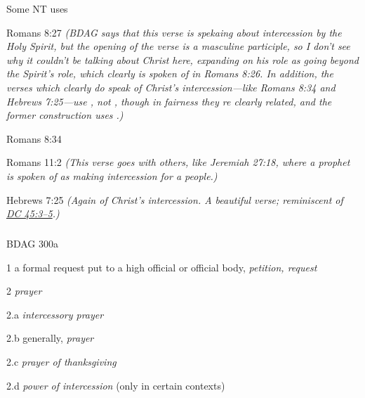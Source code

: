 				\begin{compactdesc}
					\item[Some NT uses] \textbf{}
						\begin{compactdesc}
							\item[Romans 8:27]  \textit{(BDAG says that this verse is spekaing about intercession by the Holy Spirit, but the opening of the verse is a masculine participle, so I don't see why it couldn't be talking about Christ here, expanding on his role as going beyond the Spirit's role, which clearly is spoken of in Romans 8:26. In addition, the verses which clearly do speak of Christ's intercession---like Romans 8:34 and Hebrews 7:25---use , not , though in fairness they re clearly related, and the former construction uses .)}
							\item[Romans 8:34] 
							\item[Romans 11:2]  \textit{(This verse goes with others, like Jeremiah 27:18, where a prophet is spoken of as making intercession for a people.)}
							\item[Hebrews 7:25]  \textit{(Again of Christ's intercession. A beautiful verse; reminiscent of \hyperref[DC45-3]{DC 45:3--5}.)}
						\end{compactdesc}
				\end{compactdesc}
				
			\subparagraph{\texorpdfstring{\gr{ἔντευξις}}{}}
				\label{ENTEUXIS}
			
				\begin{compactdesc}
					\item[BDAG 300a] \textbf{}
						\begin{compactitem}
							\item[1] a formal request put to a high official or official body, \textit{petition, request}
							\item[2] \textit{prayer}
							\item[2.a] \textit{intercessory prayer}
							\item[2.b] generally, \textit{prayer}
							\item[2.c] \textit{prayer of thanksgiving}
							\item[2.d] \textit{power of intercession} (only in certain contexts)
						\end{compactitem}
				\end{compactdesc}
				
